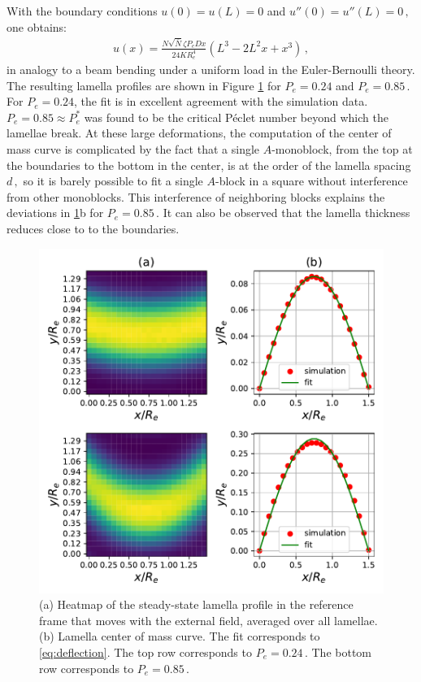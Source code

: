 \documentclass[bachelor,       %
               twoside,        %
               BCOR10mm,       %
               ngerman, english %
               ]{GAUBM}
\begin{document}
With the boundary conditions $u(0)=u(L)=0$ and $u''(0)=u''(L)=0\,,$ one obtains:
\begin{align}
    u(x)=\frac{N\sqrt{\bar N}\zeta P_e Dx}{24KR_e^4}(L^3-2L^2x+x^3)\,,
    \label{eq:deflection}
\end{align}
in analogy to a beam bending under a uniform load in the Euler-Bernoulli theory. The resulting lamella profiles are shown in Figure \ref{fig:deflection_N32} for $P_e=0.24$ and $P_e=0.85\,.$ For $P_e=0.24$, the fit is in excellent agreement with the simulation data. $P_e=0.85\approx P_e^*$ was found to be the critical P\'eclet number beyond which the lamellae break. At these large deformations, the computation of the center of mass curve is complicated by the fact that a single $A$-monoblock, from the top at the boundaries to the bottom in the center, is at the order of the lamella spacing $d\,,$ so it is barely possible to fit a single $A$-block in a square without interference from other monoblocks. This interference of neighboring blocks explains the deviations in \ref{fig:deflection_N32}b for $P_e=0.85\,.$ It can also be observed that the lamella thickness reduces close to to the boundaries.

\begin{figure}[H]
    \centering
    \includegraphics[width=\linewidth]{Thesis/figures/deflection_N32.pdf}
    \caption{(a) Heatmap of the steady-state lamella profile in the reference frame that moves with the external field, averaged over all lamellae. (b) Lamella center of mass curve. The fit corresponds to \eqref{eq:deflection}. The top row corresponds to $P_e=0.24\,.$ The bottom row corresponds to $P_e=0.85\,.$}
    \label{fig:deflection_N32}
\end{figure}
\end{document}
